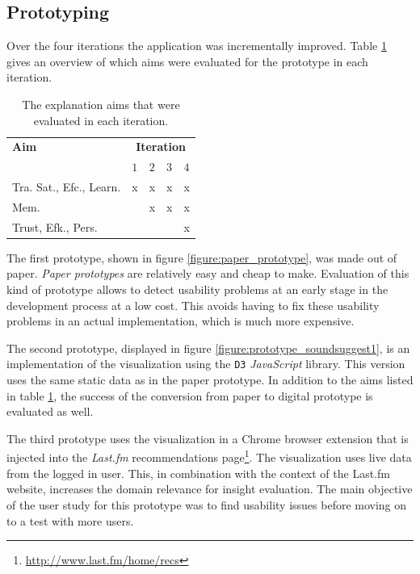 \documentclass[a4paper,10pt,twocolumn]{article}
\begin{document}
\subsection{Prototyping}\label{section:evaluation:subsection:prototyping}

Over the four iterations the application was incrementally improved. Table \ref{table:iteration:aims} gives an overview of which aims were evaluated for the prototype in each iteration.

\begin{table}
	\caption{The explanation aims that were evaluated in each iteration.}
	\begin{tabular}{l | l l l l }
		\hline
		\textbf{Aim} 							& \multicolumn{4}{c}{\textbf{Iteration}} \\
															\cline{2-5}
															& $1$ & $2$ & $3$ & $4$ \\
		\hline
		Tra. Sat., Efc., Learn.		&	x 	&	x		&	x		&	x	\\
		Mem.											&	  	&	x		&	x		&	x	\\
		Trust, Efk., Pers.				&	  	&	 		&	 		&	x	\\
		\hline
	\end{tabular}
	\label{table:iteration:aims}
\end{table}


The first prototype, shown in figure \ref{figure:paper_prototype}, was made out of paper. \emph{Paper prototypes} are relatively easy and cheap to make. Evaluation of this kind of prototype allows to detect usability problems at an early stage in the development process at a low cost. This avoids having to fix these usability problems in an actual implementation, which is much more expensive\cite{snyder:2003}.

The second prototype, displayed in figure \ref{figure:prototype_soundsuggest1}, is an implementation of the visualization using the \texttt{D3} \emph{JavaScript} library. This version uses the same static data as in the paper prototype. In addition to the aims listed in table \ref{table:iteration:aims}, the success of the conversion from paper to digital prototype is evaluated as well.

The third prototype uses the visualization in a Chrome browser extension that is injected into the \emph{Last.fm} recommendations page\footnote{\url{http://www.last.fm/home/recs}}. The visualization uses live data from the logged in user. This, in combination with the context of the Last.fm website, increases the domain relevance for insight evaluation. The main objective of the user study for this prototype was to find usability issues before moving on to a test with more users.
\end{document}
